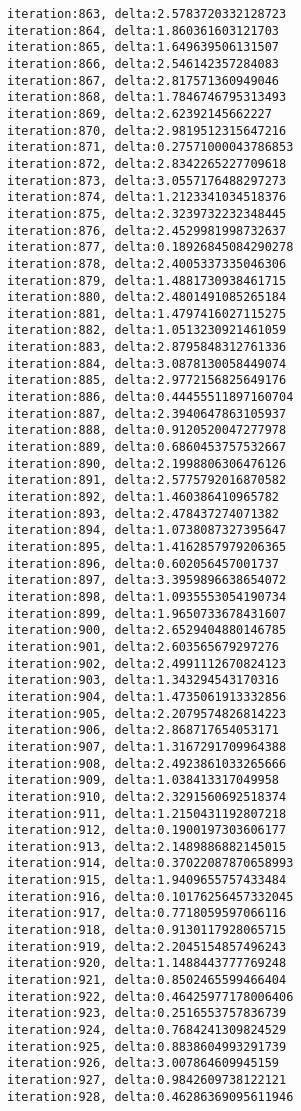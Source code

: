 \documentclass[11pt]{article}
\begin{document}
\begin{Verbatim}[commandchars=\\\{\}]
iteration:863, delta:2.5783720332128723
iteration:864, delta:1.860361603121703
iteration:865, delta:1.649639506131507
iteration:866, delta:2.546142357284083
iteration:867, delta:2.817571360949046
iteration:868, delta:1.7846746795313493
iteration:869, delta:2.62392145662227
iteration:870, delta:2.9819512315647216
iteration:871, delta:0.27571000043786853
iteration:872, delta:2.8342265227709618
iteration:873, delta:3.0557176488297273
iteration:874, delta:1.2123341034518376
iteration:875, delta:2.3239732232348445
iteration:876, delta:2.4529981998732637
iteration:877, delta:0.18926845084290278
iteration:878, delta:2.4005337335046306
iteration:879, delta:1.4881730938461715
iteration:880, delta:2.4801491085265184
iteration:881, delta:1.4797416027115275
iteration:882, delta:1.0513230921461059
iteration:883, delta:2.8795848312761336
iteration:884, delta:3.0878130058449074
iteration:885, delta:2.9772156825649176
iteration:886, delta:0.44455511897160704
iteration:887, delta:2.3940647863105937
iteration:888, delta:0.9120520047277978
iteration:889, delta:0.6860453757532667
iteration:890, delta:2.1998806306476126
iteration:891, delta:2.5775792016870582
iteration:892, delta:1.460386410965782
iteration:893, delta:2.478437274071382
iteration:894, delta:1.0738087327395647
iteration:895, delta:1.4162857979206365
iteration:896, delta:0.602056457001737
iteration:897, delta:3.3959896638654072
iteration:898, delta:1.0935553054190734
iteration:899, delta:1.9650733678431607
iteration:900, delta:2.6529404880146785
iteration:901, delta:2.603565679297276
iteration:902, delta:2.4991112670824123
iteration:903, delta:1.343294543170316
iteration:904, delta:1.4735061913332856
iteration:905, delta:2.2079574826814223
iteration:906, delta:2.868717654053171
iteration:907, delta:1.3167291709964388
iteration:908, delta:2.4923861033265666
iteration:909, delta:1.038413317049958
iteration:910, delta:2.3291560692518374
iteration:911, delta:1.2150431192807218
iteration:912, delta:0.1900197303606177
iteration:913, delta:2.1489886882145015
iteration:914, delta:0.37022087870658993
iteration:915, delta:1.9409655757433484
iteration:916, delta:0.10176256457332045
iteration:917, delta:0.7718059597066116
iteration:918, delta:0.9130117928065715
iteration:919, delta:2.2045154857496243
iteration:920, delta:1.1488443777769248
iteration:921, delta:0.8502465599466404
iteration:922, delta:0.46425977178006406
iteration:923, delta:0.2516553757836739
iteration:924, delta:0.7684241309824529
iteration:925, delta:0.8838604993291739
iteration:926, delta:3.007864609945159
iteration:927, delta:0.9842609738122121
iteration:928, delta:0.46286369095611946

\end{Verbatim}
\end{document}
